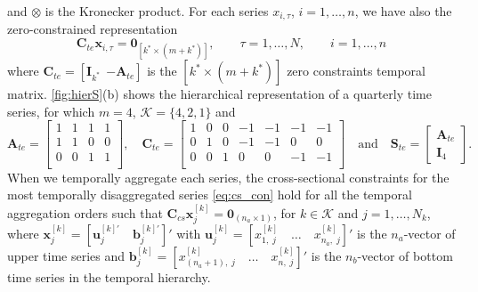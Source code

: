 \documentclass[a4paper,11pt]{article}
\newcommand{\bvet}{\bm{b}}
\newcommand{\uvet}{\bm{u}}
\newcommand{\xvet}{\bm{x}}
\newcommand{\Avet}{\bm{A}}
\newcommand{\Cvet}{\bm{C}}
\newcommand{\Ivet}{\bm{I}}
\newcommand{\Svet}{\bm{S}}
\newcommand{\Zerovet}{\bm{0}}
\theoremstyle{definition}
\begin{document}
and $\otimes$ is the Kronecker product. For each series $x_{i,\tau}$, $i = 1,\dots,n$, we have also the zero-constrained representation
\begin{equation}
	\label{eq:te_con}
	\Cvet_{te}\xvet_{i,\tau} = \Zerovet_{[k^\ast \times (m+k^\ast)]}, \qquad \tau = 1,\dots,N, \qquad i = 1,\dots, n
\end{equation}
where $\Cvet_{te} = [\Ivet_{k^\ast} ~~ {-\Avet_{te}}]$ is the $[k^\ast \times (m+k^\ast)]$ zero constraints temporal matrix. \autoref{fig:hierS}(b) shows the hierarchical representation of a quarterly time series, for which $m = 4$, $\mathcal{K} = \{4,2,1\}$ and
$$
	\Avet_{te} = \begin{bmatrix}
		1 & 1 & 1 & 1 \\
		1 & 1 & 0 & 0 \\
		0 & 0 & 1 & 1 \\
	\end{bmatrix}, \quad \Cvet_{te} = \begin{bmatrix}
		1 & 0 & 0 & -1 & -1 & -1 & -1 \\
		0 & 1 & 0 & -1 & -1 & 0  & 0  \\
		0 & 0 & 1 & 0  & 0  & -1 & -1 \\
	\end{bmatrix} \quad \mathrm{and} \quad \Svet_{te} = \begin{bmatrix}
		\Avet_{te} \\
		\Ivet_4
	\end{bmatrix}.
$$
When we temporally aggregate each series, the cross-sectional constraints for the most temporally disaggregated series \eqref{eq:cs_con} hold for all the temporal aggregation orders such that $\Cvet_{cs}\xvet^{[k]}_j = \Zerovet_{(n_a \times 1)}$, for $k \in \mathcal{K}$ and $j = 1, \dots, N_k$, where $\xvet_j^{[k]} = \left[\uvet_j^{[k]\prime}\quad \bvet_j^{[k]\prime}\right]'$ with $\uvet^{[k]}_j = \left[ x^{[k]}_{1,\;j}\quad \dots\quad x^{[k]}_{n_a,\;j}\right]'$ is the $n_a$-vector of upper time series and $\bvet^{[k]}_j = \left[x^{[k]}_{(n_a+1),\;j}\quad\dots\quad x^{[k]}_{n,\;j}\right]'$ is the $n_b$-vector of bottom time series in the temporal hierarchy.
\end{document}
